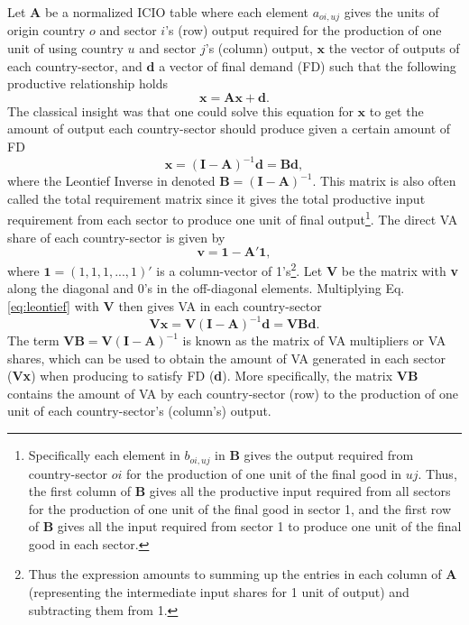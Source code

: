 \documentclass[a4paper]{article}
\begin{document}
Let $\textbf{A}$ be a normalized ICIO table where each element $a_{oi,uj}$ gives the units of origin country $o$ and sector $i$'s (row) output required for the production of one unit of using country $u$ and sector $j$'s (column) output, $\textbf{x}$ the vector of outputs of each country-sector, and $\textbf{d}$ a vector of final demand (FD) such that the following productive relationship holds
%
\begin{equation} \label{eq:io_model}
\textbf{x} = \textbf{A}\textbf{x} + \textbf{d}.
\end{equation}
%
The classical \citet{leontief1936quantitative} insight was that one could solve this equation for $\textbf{x}$ to get the amount of output each country-sector should produce given a certain amount of FD
%
\begin{equation} \label{eq:leontief}
\textbf{x} = (\textbf{I}-\textbf{A})^{-1} \textbf{d} = \textbf{B}\textbf{d},
\end{equation}
%
\noindent where the Leontief Inverse in denoted $\textbf{B} = (\textbf{I}-\textbf{A})^{-1}$. This matrix is also often called the total requirement matrix since it gives the total productive input requirement from each sector to produce one unit of final output\footnote{Specifically each element in $b_{oi,uj}$ in \textbf{B} gives the output required from country-sector $oi$ for the production of one unit of the final good in $uj$. Thus, the first column of \textbf{B} gives all the productive input required from all sectors for the production of one unit of the final good in sector 1, and the first row of \textbf{B} gives all the input required from sector 1 to produce one unit of the final good in each sector.}. The direct VA share of each country-sector is given by
%
\begin{equation}
\textbf{v} = \textbf{1} - \textbf{A}'\textbf{1},
\end{equation}
%
where $\textbf{1} = (1, 1, 1, ..., 1)'$ is a column-vector of 1's\footnote{Thus the expression amounts to summing up the entries in each column of \textbf{A} (representing the intermediate input shares for 1 unit of output) and subtracting them from 1.}. Let \textbf{V} be the matrix with \textbf{v} along the diagonal and 0's in the off-diagonal elements. Multiplying Eq. \ref{eq:leontief} with $\textbf{V}$ then gives VA in each country-sector
%
\begin{equation} \label{eq:VB}
\textbf{V}\textbf{x} = \textbf{V}(\textbf{I}-\textbf{A})^{-1} \textbf{d} = \textbf{VBd}.
\end{equation}
%
The term $\textbf{VB} = \textbf{V}(\textbf{I}-\textbf{A})^{-1}$ is known as the matrix of VA multipliers or VA shares, which can be used to obtain the amount of VA generated in each sector (\textbf{Vx}) when producing to satisfy FD (\textbf{d}). More specifically, the matrix $\textbf{VB}$ contains the amount of VA by each country-sector (row) to the production of one unit of each country-sector's (column's) output. 
\end{document}

